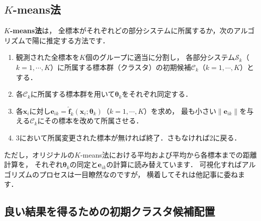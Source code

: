 ﻿\documentclass{jsarticle}
\begin{document}
\subsection{$K$-means法}

{\bf $K$-means法}\cite{bib:macqueen1967,bib:duda1973}は，
全標本がそれぞれどの部分システムに所属するか，次のアルゴリズムで陽に推定する方法です．
\begin{screen}
\begin{enumerate}
\setlength{\itemsep}{-.2\baselineskip}
\item{観測された全標本を$K$個のグループに適当に分割し，
各部分システム$\mathcal{S}_{k}$（$k=1,\cdots,K$）に所属する標本群（クラスタ）の初期候補$\mathcal{C}_{k}$（$k=1,\cdots,K$）とする．}
\item{各$\mathcal{C}_{k}$に所属する標本群を用いて$\bm{\theta}_{k}$をそれぞれ同定する．}
\item{各$\bm{x}_{i}$に対し$\bm{e}_{ik}=\hat{\bm{f}}_{k}(\bm{x}_{i};\bm{\theta}_{k})$（$k=1,\cdots,K$）を求め，
最も小さい$\|\bm{e}_{ik}\|$を与える$\mathcal{C}_{k}$にその標本を改めて所属させる．
}
\item{3において所属変更された標本が無ければ終了．さもなければ2に戻る．}
\end{enumerate}
\end{screen}
ただし，オリジナルの$K$-means法における平均および平均から各標本までの距離計算を，
それぞれ$\bm{\theta}_{k}$の同定と$\bm{e}_{ik}$の計算に読み替えています．
可視化すればアルゴリズムのプロセスは一目瞭然なのですが，
横着してそれは他記事に委ねます．

\subsection{良い結果を得るための初期クラスタ候補配置}
\end{document}
